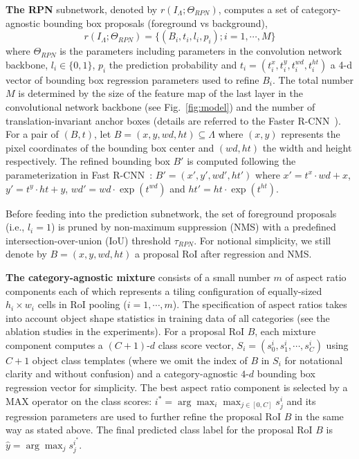 \documentclass[10pt,twocolumn,letterpaper]{article}
\begin{document}
\textbf{The RPN} subnetwork, denoted by $r(I_{\Lambda};\Theta_{RPN})$,  computes a set of category-agnostic bounding box proposals (foreground vs background),
\begin{equation}
r(I_{\Lambda};\Theta_{RPN})=\{(B_i, t_i, l_i, p_i); i=1,\cdots, M\}\label{eqn:RPNscoring}
\end{equation}  
where $\Theta_{RPN}$ is the parameters including parameters in the convolution network backbone, $l_i\in\{0, 1\}$, $p_i$ the prediction probability and $t_i=(t_i^x, t_i^y, t_i^{wd}, t_i^{ht})$ a 4-d vector of bounding box regression parameters used to refine $B_i$. The total number $M$ is determined by the size of the feature map of the last layer in the convolutional network backbone (see Fig.~\ref{fig:model}) and the number of translation-invariant anchor boxes (details are referred to the Faster R-CNN~\cite{faster_rcnn}). For a pair of $(B, t)$, let $B=(x, y, wd, ht)\subseteq \Lambda$ where $(x,y)$ represents the pixel coordinates of the bounding box center and $(wd, ht)$ the width and height respectively. The refined bounding box $B'$ is computed following the parameterization in Fast R-CNN~\cite{fast_rcnn}: $B'=(x', y', wd', ht')$ where  
$x' = t^x \cdot wd + x$, $y' = t^y \cdot ht + y$, $wd' = wd \cdot \exp(t^{wd})$ and $ht' = ht \cdot \exp(t^{ht})$.

Before feeding into the prediction subnetwork, the set of foreground proposals (i.e., $l_i=1$) is pruned by non-maximum suppression (NMS) with a predefined intersection-over-union (IoU) threshold $\tau_{RPN}$.  For notional simplicity, we still denote by $B=(x, y, wd, ht)$ a proposal RoI after regression and NMS. 

\textbf{The category-agnostic mixture} consists of a small number $m$ of aspect ratio components each of which represents a tiling configuration of equally-sized $h_i\times w_i$ cells in RoI pooling ($i=1, \cdots, m$). The specification of aspect ratios takes into account object shape statistics in training data of all categories (see the ablation studies in the experiments). For a proposal RoI $B$, each mixture component computes a $(C+1)$-$d$ class score vector, $S_i=(s^i_0,s^i_1, \cdots, s^i_{C})$ using $C+1$ object class templates (where we omit the index of $B$ in $S_i$ for notational clarity and without confusion) and a category-agnostic $4$-$d$ bounding box regression vector for simplicity. The best aspect ratio component is selected by a MAX operator on the class scores: $i^*=\arg\max_i \max_{j\in[0,C]} s^i_j$ and its regression parameters are used to further refine the proposal RoI $B$ in the same way as stated above. The final predicted class label for the proposal RoI $B$ is $\hat{y}=\arg\max_j s^{i^*}_j$.
\end{document}
